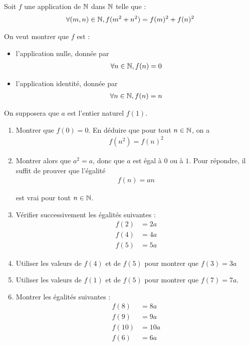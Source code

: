 \documentclass[french,a4paper,10pt]{article}
\begin{document}
	\begin{td-exo}[]
		Soit $f$ une application de $\mathbb{N}$ dans $\mathbb{N}$ telle que :
			\[\begin{aligned}
				\forall (m,n)\in\mathbb{N}, f(m^2+n^2)=f(m)^2+f(n)^2
			\end{aligned}\]
			
		On veut montrer que $f$ est :
			\begin{itemize}
				\item l'application nulle, donnée par 
					\[\begin{aligned}
						\forall n\in \mathbb{N},f(n)=0
					\end{aligned}\]
				\item l'application identité, donnée par 
					\[\begin{aligned}
						\forall n\in\mathbb{N},f(n)=n
					\end{aligned}\]
			\end{itemize}
		
		On supposera que $a$ est l'entier naturel $f(1)$.
		\begin{enumerate}
			\item Montrer que $f(0)=0$. En déduire que pour tout $n\in\mathbb{N}$, on a
				\[\begin{aligned}
					f(n^2)=f(n)^2
				\end{aligned}\]
				
			\item Montrer alors que $a^2=a$, donc que $a$ est égal à $0$ ou à $1$. Pour répondre, il suffit de prouver que l'égalité
				\[\begin{aligned}
					f(n)=an
				\end{aligned}\]
				
			est vrai pour tout $n\in\mathbb{N}$.
			
			\item Vérifier successivement les égalités suivantes :
				\[\begin{aligned}
					f(2)&=2a\\
					f(4)&=4a\\
					f(5)&=5a
				\end{aligned}\]
				
			\item Utiliser les valeurs de $f(4)$ et de $f(5)$ pour montrer que $f(3)=3a$
			
			\item Utiliser les valeurs de $f(1)$ et de $f(5)$ pour montrer que $f(7) = 7a$.
			
			\item Montrer les égalités suivantes :
				\[\begin{aligned}
					f(8)&=8a\\
					f(9)&=9a\\
					f(10)&=10a\\
					f(6)&=6a
				\end{aligned}\]
			

\end{enumerate}
\end{td-exo}
\end{document}
